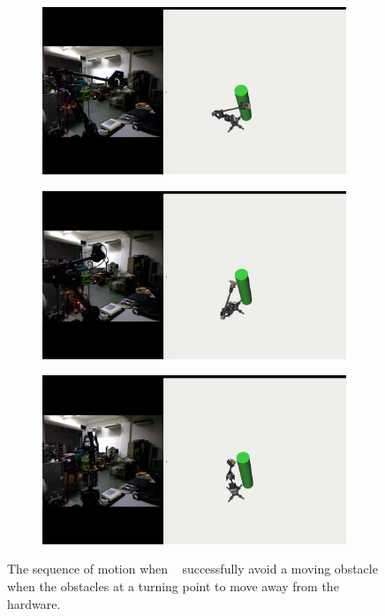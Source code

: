 \begin{figure}
\begin{subfigure}[b]{0.4\linewidth}
    \caption{}
  \end{subfigure}
  \begin{subfigure}[b]{0.4\linewidth}
    \includegraphics[width=\linewidth]{obs_avoidance4.png}
    \caption{}
  \end{subfigure}
  \begin{subfigure}[b]{0.4\linewidth}
    \includegraphics[width=\linewidth]{obs_avoidance5.png}
    \caption{}
  \end{subfigure}
  \begin{subfigure}[b]{0.4\linewidth}
    \includegraphics[width=\linewidth]{obs_avoidance6.png}
    \caption{}
  \end{subfigure}

  \caption{The sequence of motion when \rimini~ successfully avoid a moving obstacle
  when the obstacles at a turning point to move away from the hardware.}
  \label{fig:obs_avoidance}
\end{figure}
